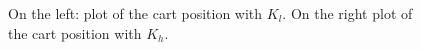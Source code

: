   \begin{figure}[!tbh]
  \centering
  \hfill
  \caption{On the left: plot of the cart position with  $K_l$. On the right plot of the cart position with $K_h$.}
    \label{fig:poss}
\end{figure}